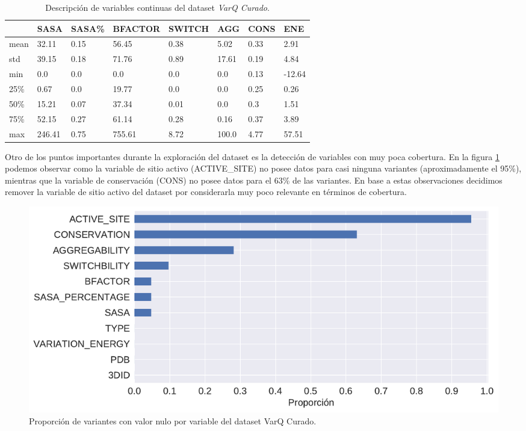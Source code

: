 \begin{table}[H]
\centering
\begin{tabular}{|l|l|l|l|l|l|l|l|}
\hline
 & SASA & SASA\% & BFACTOR & SWITCH & AGG & CONS & ENE \\ \hline
mean & 32.11 & 0.15 & 56.45 & 0.38 & 5.02 & 0.33 & 2.91 \\ \hline
std & 39.15 & 0.18 & 71.76 & 0.89 & 17.61 & 0.19 & 4.84 \\ \hline
min & 0.0 & 0.0 & 0.0 & 0.0 & 0.0 & 0.13 & -12.64 \\ \hline
25\% & 0.67 & 0.0 & 19.77 & 0.0 & 0.0 & 0.25 & 0.26 \\ \hline
50\% & 15.21 & 0.07 & 37.34 & 0.01 & 0.0 & 0.3 & 1.51 \\ \hline
75\% & 52.15 & 0.27 & 61.14 & 0.28 & 0.16 & 0.37 & 3.89 \\ \hline
max & 246.41 & 0.75 & 755.61 & 8.72 & 100.0 & 4.77 & 57.51 \\ \hline
\end{tabular}
\caption{Descripción de variables continuas del dataset \textit{VarQ Curado}.}
\label{tab:descripcion_varq}
\end{table}

Otro de los puntos importantes durante la exploración del dataset es la detección de variables con muy poca cobertura. En la figura \ref{fig:proporcion_nulos_varq} podemos observar como la variable de sitio activo (ACTIVE\_SITE) no posee datos para casi ninguna variantes (aproximadamente el 95\%), mientras que la variable de conservación (CONS) no posee datos para el 63\% de las variantes. En base a estas observaciones decidimos remover la variable de sitio activo del dataset por considerarla muy poco relevante en términos de cobertura.

\begin{figure}[H]
    \centering
    \includegraphics[scale=0.55]{documents/latex/figures/3/proporcion_nulos.pdf}
    \caption{Proporción de variantes con valor nulo por variable del dataset VarQ Curado.}
    \label{fig:proporcion_nulos_varq}
\end{figure}

